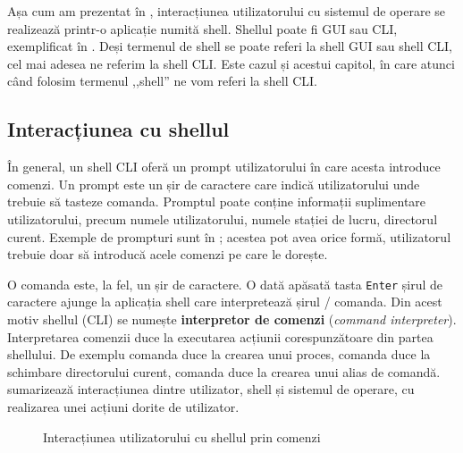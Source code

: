 Așa cum am prezentat în , interacțiunea utilizatorului cu sistemul de operare se realizează printr-o aplicație numită shell. Shellul poate fi GUI sau CLI, exemplificat în . Deși termenul de shell se poate referi la shell GUI sau shell CLI, cel mai adesea ne referim la shell CLI. Este cazul și acestui capitol, în care atunci când folosim termenul ,,shell'' ne vom referi la shell CLI.

\subsection{Interacțiunea cu shellul}
\label{sec:cli:shell:interact}

În general, un shell CLI oferă un prompt utilizatorului în care acesta introduce comenzi. Un prompt este un șir de caractere care indică utilizatorului unde trebuie să tasteze comanda. Promptul poate conține informații suplimentare utilizatorului, precum numele utilizatorului, numele stației de lucru, directorul curent. Exemple de prompturi sunt în ; acestea pot avea orice formă, utilizatorul trebuie doar să introducă acele comenzi pe care le dorește.


O comanda este, la fel, un șir de caractere. O dată apăsată tasta \texttt{Enter} șirul de caractere ajunge la aplicația shell care interpretează șirul / comanda. Din acest motiv shellul (CLI) se numește \textbf{interpretor de comenzi} (\textit{command interpreter}). Interpretarea comenzii duce la executarea acțiunii corespunzătoare din partea shellului. De exemplu comanda  duce la crearea unui proces, comanda  duce la schimbare directorului curent, comanda  duce la crearea unui alias de comandă.  sumarizează interacțiunea dintre utilizator, shell și sistemul de operare, cu realizarea unei acțiuni dorite de utilizator.

\begin{figure}[htbp]
  \centering
  \def\svgwidth{0.6\columnwidth}
  
  \caption{Interacțiunea utilizatorului cu shellul prin comenzi}
  \label{fig:cli:user-shell-cmd}
\end{figure}

